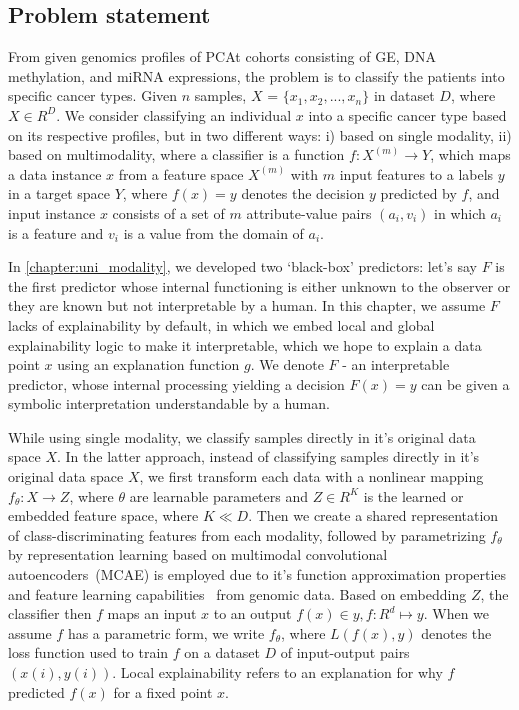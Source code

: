\subsection{Problem statement}
From given genomics profiles of PCAt cohorts consisting of GE, DNA methylation, and miRNA expressions, the problem is to classify the patients into specific cancer types. Given $n$ samples, $X$ = ${{\{x_1,x_2, ..., x_n}}\}$ in dataset $D$, where $X \in {R}^{D}$. We consider classifying an individual $x$ into a specific cancer type based on its respective profiles, but in two different ways: i) based on single modality, ii) based on multimodality, where a  classifier is a function $f: {X}^{(m)} \rightarrow {Y}$, which maps a data instance $x$ from a feature space ${X}^{(m)}$ with $m$ input features to a labels $y$ in a target space ${Y}$, where $f(x)=y$ denotes the decision $y$ predicted by $f$, and input instance $x$ consists of a set of $m$ attribute-value pairs $\left(a_{i}, v_{i}\right)$ in which $a_i$ is a feature and $v_i$ is a value from the domain of $a_i$. 

\hspace*{3.5mm} In \cref{chapter:uni_modality}, we developed two `black-box' predictors: let's say $F$ is the first predictor whose internal functioning is either unknown to the observer or they are known but not interpretable by a human. In this chapter, we assume $F$ lacks of explainability by default, in which we embed local and global explainability logic to make it interpretable, which we hope to explain a data point $x$ using an explanation function $g$. We denote ${F}$ - an interpretable predictor, whose internal processing yielding a decision ${F}(x)=y$ can be given a symbolic interpretation understandable by a human. 

\hspace*{3.5mm} While using single modality, we classify samples directly in it's original data space $X$. In the latter approach, instead of classifying samples directly in it's original data space $X$, we first transform each data with a nonlinear mapping $f_{\theta}: X \rightarrow Z$, where $\theta$ are learnable parameters and $Z \in {R}^{K}$ is the learned or embedded feature space, where $K \ll D$. Then we create a shared representation of class-discriminating features from each modality, followed by parametrizing $f_{\theta}$ by representation learning based on multimodal convolutional autoencoders~(MCAE) is employed due to it's function approximation properties and feature learning capabilities~\cite{xie2016unsupervised,karim2019drug} from genomic data. Based on embedding $Z$, the classifier then $f$ maps an input $x$ to an output $f(x) \in y, f: {R}^{d} \mapsto y$. When we assume $f$ has a parametric form, we write $f_{\theta}$, where ${L}(f(x), y)$ denotes the loss function used to train $f$ on a dataset $D$ of input-output pairs $(x(i), y(i))$. Local explainability refers to an explanation for why $f$ predicted $f(x)$ for a fixed point $x$. 

